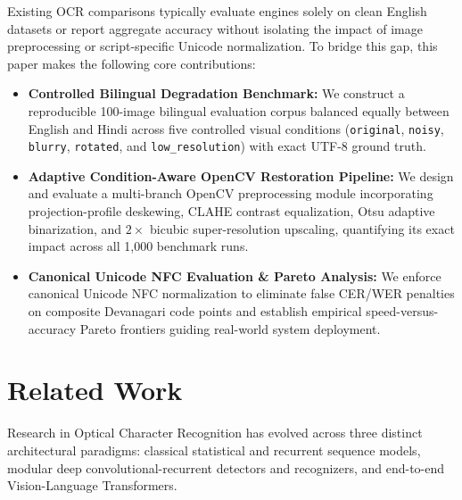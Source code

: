 \documentclass[11pt,a4paper]{article}
\begin{document}
Existing OCR comparisons typically evaluate engines solely on clean English datasets or report aggregate accuracy without isolating the impact of image preprocessing or script-specific Unicode normalization. To bridge this gap, this paper makes the following core contributions:
\begin{itemize}[leftmargin=1.4em]
    \item \textbf{Controlled Bilingual Degradation Benchmark:} We construct a reproducible 100-image bilingual evaluation corpus balanced equally between English and Hindi across five controlled visual conditions (\texttt{original}, \texttt{noisy}, \texttt{blurry}, \texttt{rotated}, and \texttt{low\_resolution}) with exact UTF-8 ground truth.
    \item \textbf{Adaptive Condition-Aware OpenCV Restoration Pipeline:} We design and evaluate a multi-branch OpenCV preprocessing module incorporating projection-profile deskewing, CLAHE contrast equalization, Otsu adaptive binarization, and $2\times$ bicubic super-resolution upscaling, quantifying its exact impact across all 1,000 benchmark runs.
    \item \textbf{Canonical Unicode NFC Evaluation & Pareto Analysis:} We enforce canonical Unicode NFC normalization to eliminate false CER/WER penalties on composite Devanagari code points and establish empirical speed-versus-accuracy Pareto frontiers guiding real-world system deployment.
\end{itemize}

\newpage
\section{Related Work}
Research in Optical Character Recognition has evolved across three distinct architectural paradigms: classical statistical and recurrent sequence models, modular deep convolutional-recurrent detectors and recognizers, and end-to-end Vision-Language Transformers.
\end{document}
